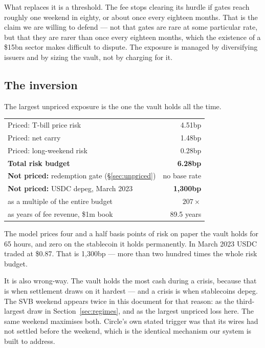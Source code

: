 \documentclass[11pt,a4paper]{article}
\begin{document}
What replaces it is a threshold. The fee stops clearing its hurdle if gates reach roughly
one weekend in eighty, or about once every eighteen months. That is the claim we are
willing to defend — not that gates are rare at some particular rate, but that they are
rarer than once every eighteen months, which the existence of a \$15bn sector makes
difficult to dispute. The exposure is managed by diversifying issuers and by sizing the
vault, not by charging for it.

\subsection{The inversion}
\label{sec:inversion}

The largest unpriced exposure is the one the vault holds all the time.

\begin{center}
\small
\begin{tabular}{@{}lr@{}}
\toprule
Priced: T-bill price risk & 4.51bp \\
Priced: net carry & 1.48bp \\
Priced: long-weekend risk & 0.28bp \\
\midrule
\textbf{Total risk budget} & \textbf{6.28bp} \\
\midrule
\textbf{Not priced:} redemption gate (\S\ref{sec:unpriced}) & no base rate \\
\textbf{Not priced:} USDC depeg, March 2023 & \textbf{1{,}300bp} \\
\quad as a multiple of the entire budget & $207\times$ \\
\quad as years of fee revenue, \$1m book & 89.5 years \\
\bottomrule
\end{tabular}
\end{center}

The model prices four and a half basis points of risk on paper the vault holds for 65
hours, and zero on the stablecoin it holds permanently. In March 2023 USDC traded at
\$0.87. That is 1{,}300bp — more than two hundred times the whole risk budget.

It is also wrong-way. The vault holds the most cash during a crisis, because that is when
settlement draws on it hardest — and a crisis is when stablecoins depeg. The SVB weekend
appears twice in this document for that reason: as the third-largest draw in
Section~\ref{sec:regimes}, and as the largest unpriced loss here. The same weekend
maximises both. Circle's own stated trigger was that its wires had not settled before the
weekend, which is the identical mechanism our system is built to address.
\end{document}
